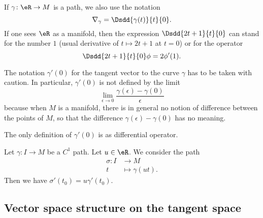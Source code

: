 If \( \gamma\colon \eR\to M\) is a path, we also use the notation
\begin{equation}        \label{EQooJQVRooLziKoH}
	\nabla_{\gamma}=\Dsdd{ \gamma(t) }{t}{0}.
\end{equation}
If one sees \( \eR\) as a manifold, then the expression \( \Dsdd{ 2t+1 }{t}{0}\) can stand for the number \( 1\) (usual derivative of \( t\mapsto 2t+1\) at \( t=0\)) or for the operator
\begin{equation}
	\Dsdd{ 2t+1 }{t}{0}\phi=2\phi'(1).
\end{equation}

\begin{remark}      \label{REMooJQFHooQuoZxt}
	The notation \( \gamma'(0)\) for the tangent vector to the curve \( \gamma\) has to be taken with caution. In particular, \( \gamma'(0)\) is not defined by the limit
	\begin{equation}        \label{EQooVMGFooFUCNEY}
		\lim_{\epsilon\to 0} \frac{ \gamma(\epsilon)-\gamma(0) }{ \epsilon }
	\end{equation}
	because when \( M\) is a manifold, there is in general no notion of difference between the points of \( M\), so that the difference \( \gamma(\epsilon)-\gamma(0)\) has no meaning.

	The only definition of \( \gamma'(0)\) is as differential operator.
\end{remark}

\begin{lemma}        \label{LEMooMHSQooQyTZCg}
	Let \( \gamma\colon I\to M\) be a \( C^1\) path. Let \( u\in \eR\). We consider the path
	\begin{equation}
		\begin{aligned}
			\sigma\colon I & \to M               \\
			t              & \mapsto \gamma(ut).
		\end{aligned}
	\end{equation}
	Then we have \( \sigma'(t_0)=u\gamma'(t_0)\).
\end{lemma}

\subsection{Vector space structure on the tangent space}

